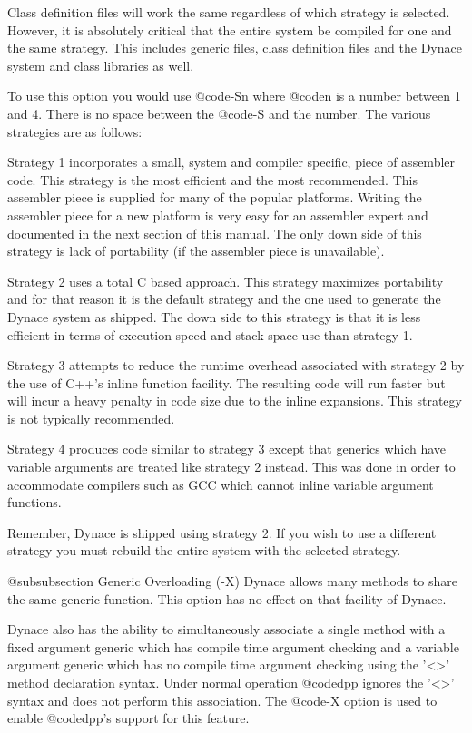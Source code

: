 Class definition files will work the same regardless of which strategy
is selected.  However, it is absolutely critical that the entire system
be compiled for one and the same strategy.  This includes generic files,
class definition files and the Dynace system and class libraries as well.

To use this option you would use @code{-Sn} where @code{n} is a number
between 1 and 4.  There is no space between the @code{-S} and the number.
The various strategies are as follows:

Strategy 1 incorporates a small, system and compiler specific, piece of
assembler code.  This strategy is the most efficient and the most
recommended.  This assembler piece is supplied for many of the popular
platforms.  Writing the assembler piece for a new platform is very easy
for an assembler expert and documented in the next section of this manual.
The only down side of this strategy is lack of portability (if the
assembler piece is unavailable).

Strategy 2 uses a total C based approach.  This strategy maximizes
portability and for that reason it is the default strategy and the one
used to generate the Dynace system as shipped.  The down side to this
strategy is that it is less efficient in terms of execution speed and
stack space use than strategy 1.

Strategy 3 attempts to reduce the runtime overhead associated with
strategy 2 by the use of C++'s inline function facility.  The resulting
code will run faster but will incur a heavy penalty in code size due
to the inline expansions.  This strategy is not typically recommended.

Strategy 4 produces code similar to strategy 3 except that generics
which have variable arguments are treated like strategy 2 instead.
This was done in order to accommodate compilers such as GCC which
cannot inline variable argument functions.

Remember, Dynace is shipped using strategy 2.  If you wish to use a
different strategy you must rebuild the entire system with the selected
strategy.

@subsubsection Generic Overloading (-X)
Dynace allows many methods to share the same generic function.  This
option has no effect on that facility of Dynace.

Dynace also has the ability to simultaneously associate a single method
with a fixed argument generic which has compile time argument checking
and a variable argument generic which has no compile time argument
checking using the '<>' method declaration syntax.  Under normal
operation @code{dpp} ignores the '<>' syntax and does not perform
this association.  The @code{-X} option is used to enable @code{dpp}'s
support for this feature.

